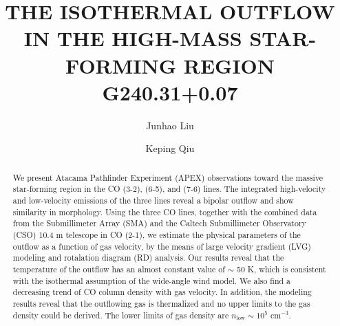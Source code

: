 \documentclass[twocolumn]{aastex61}
\begin{document}
\title{THE ISOTHERMAL OUTFLOW IN THE HIGH-MASS STAR-FORMING REGION G240.31+0.07}




\author{Junhao Liu}

\author{Keping Qiu}

\begin{abstract}
We present Atacama Pathfinder Experiment (APEX) observations toward the massive star-forming region  in the CO (3-2), (6-5), and (7-6) lines. The integrated high-velocity and low-velocity emissions of the three lines reveal a bipolar outflow and show similarity in morphology. Using the three CO lines, together with the combined data from the Submillimeter Array (SMA) and the Caltech Submillimeter Observatory (CSO) 10.4 m telescope in CO (2-1), we estimate the physical parameters of the  outflow as a function of gas velocity, by the means of large velocity gradient (LVG) modeling and rotalation diagram (RD) analysis. Our results reveal that the temperature of the outflow has an almost constant value of $\sim$ 50 K, which is consistent with the isothermal assumption of the wide-angle wind model. We also find a decreasing trend of CO column density with gas velocity. In addition, the modeling results reveal that the outflowing gas is thermalized and no upper limits to the gas density could be derived. The lower limits of gas density are $n_{\mathrm{low}} \sim 10^5$ cm$^{-3}$.

\end{abstract}







\end{document}
